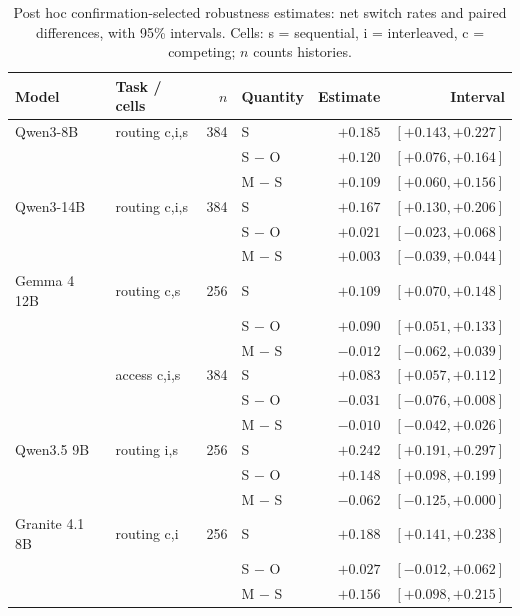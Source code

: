 \begin{table}[t]
\centering
\small
\setlength{\tabcolsep}{5pt}
\begin{tabular}{@{}llrlrr@{}}
\toprule
Model & Task / cells & $n$ & Quantity & Estimate & Interval \\
\midrule
Qwen3-8B & routing c,i,s & 384 & S & $+0.185$ & $[+0.143, +0.227]$ \\
 &  &  & S $-$ O & $+0.120$ & $[+0.076, +0.164]$ \\
 &  &  & M $-$ S & $+0.109$ & $[+0.060, +0.156]$ \\
\midrule
Qwen3-14B & routing c,i,s & 384 & S & $+0.167$ & $[+0.130, +0.206]$ \\
 &  &  & S $-$ O & $+0.021$ & $[-0.023, +0.068]$ \\
 &  &  & M $-$ S & $+0.003$ & $[-0.039, +0.044]$ \\
\midrule
Gemma 4 12B & routing c,s & 256 & S & $+0.109$ & $[+0.070, +0.148]$ \\
 &  &  & S $-$ O & $+0.090$ & $[+0.051, +0.133]$ \\
 &  &  & M $-$ S & $-0.012$ & $[-0.062, +0.039]$ \\
 & access c,i,s & 384 & S & $+0.083$ & $[+0.057, +0.112]$ \\
 &  &  & S $-$ O & $-0.031$ & $[-0.076, +0.008]$ \\
 &  &  & M $-$ S & $-0.010$ & $[-0.042, +0.026]$ \\
\midrule
Qwen3.5 9B & routing i,s & 256 & S & $+0.242$ & $[+0.191, +0.297]$ \\
 &  &  & S $-$ O & $+0.148$ & $[+0.098, +0.199]$ \\
 &  &  & M $-$ S & $-0.062$ & $[-0.125, +0.000]$ \\
\midrule
Granite 4.1 8B & routing c,i & 256 & S & $+0.188$ & $[+0.141, +0.238]$ \\
 &  &  & S $-$ O & $+0.027$ & $[-0.012, +0.062]$ \\
 &  &  & M $-$ S & $+0.156$ & $[+0.098, +0.215]$ \\
\bottomrule
\end{tabular}
\caption{Post hoc confirmation-selected robustness estimates: net switch rates and paired differences, with 95\% intervals. Cells: s = sequential, i = interleaved, c = competing; $n$ counts histories.}
\label{tab:cross-model-confirmation-switches}
\end{table}

